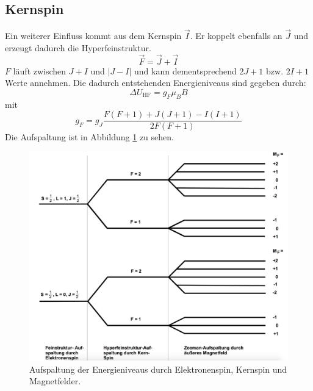 \subsection{Kernspin}
Ein weiterer Einfluss kommt aus dem Kernspin $\vec{I}$. Er koppelt ebenfalls an $\vec{J}$ und erzeugt dadurch die Hyperfeinstruktur.
\begin{equation}
	\vec{F}=\vec{J} +\vec{I}
\end{equation}
$F$ läuft zwischen $J+I$ und $|J-I|$ und kann dementsprechend $2J+1$ bzw. $2I+1$ Werte annehmen. Die dadurch entstehenden Energieniveaus sind gegeben durch:
\begin{equation}
	\Delta U_\text{HF}=g_F\mu_BB
	\label{eqn:Zeeman}
\end{equation}
mit
\begin{equation}
	g_F=g_J\frac{F(F+1)+J(J+1)-I(I+1)}{2F(F+1)}
	\label{eqn:g_F}
\end{equation}
Die Aufspaltung ist in Abbildung \ref{fig:Zeeman} zu sehen.
\begin{figure}
	\centering
	\includegraphics[width=0.8\linewidth]{img/zeemann.jpg}
	\caption{Aufspaltung der Energieniveaus durch Elektronenspin, Kernspin und Magnetfelder.\cite{V21}}
	\label{fig:Zeeman}
\end{figure}
